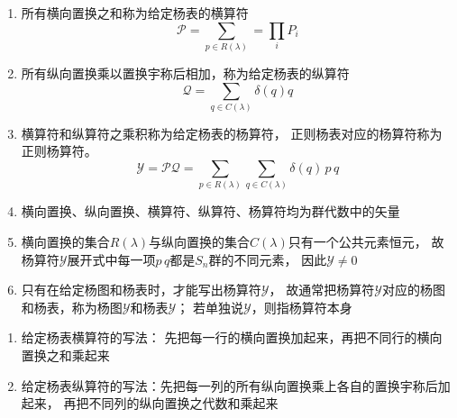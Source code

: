 \begin{newlemma}[横算符和纵算符]
	\begin{enumerate}
		\item 
		所有横向置换之和称为给定杨表的{\color{seco}横算符}
		{
		\color{seco}
		\begin{equation}
			\mathcal{P}=\sum\limits_{p\in R(\lambda)}=\prod\limits_i P_i
		\end{equation}
		}
		\item 
		所有纵向置换乘以置换宇称后相加，称为给定杨表的纵算符
		{
			\color{seco}
			\begin{equation}
			\mathcal{Q}=\sum\limits_{q\in C(\lambda)} \delta(q) q
			\end{equation}
		}
		\item
	横算符和纵算符之乘积称为给定杨表的{\color{seco}杨算符}，
	正则杨表对应的杨算符称为{\color{seco}正则杨算符}。
	{
		\color{seco}
		\begin{equation}
		\mathcal{Y}
		=\mathcal{P}\mathcal{Q}
		=\sum\limits_{p\in R(\lambda)} \sum\limits_{q\in C(\lambda)}
		\delta(q)\,p\,q
		\end{equation}
	}
	\item 
	横向置换、纵向置换、横算符、纵算符、杨算符均为群代数中的矢量
	\item 
	横向置换的集合$R(\lambda)$与纵向置换的集合$C(\lambda)$只有一个公共元素恒元，
	故杨算符$\mathcal{Y}$展开式中每一项$p\,q$都是$S_n$群的不同元素，
	因此{\color{seco}$\mathcal{Y}\neq 0$}
	\item 
	只有在给定杨图和杨表时，才能写出杨算符$\mathcal{Y}$，
	故通常把杨算符$\mathcal{Y}$对应的杨图和杨表，称为杨图$\mathcal{Y}$和杨表$\mathcal{Y}$；
	若单独说$\mathcal{Y}$，则指杨算符本身
	\end{enumerate}
\end{newlemma}

\begin{note}
	\begin{enumerate}
		\item 
		给定杨表{\color{seco}横算符的写法}：
		先把每一行的横向置换加起来，再把不同行的横向置换之和乘起来
		\item 
		给定杨表{\color{seco}纵算符的写法}：先把每一列的所有纵向置换乘上各自的置换宇称后加起来，
		再把不同列的纵向置换之代数和乘起来
	\end{enumerate}
\end{note}

